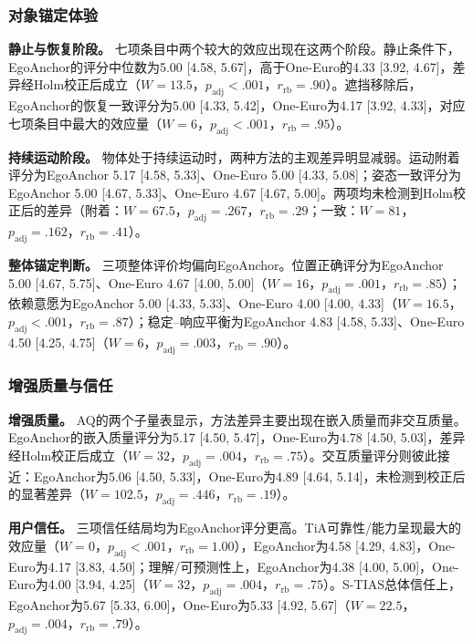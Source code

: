 \documentclass[review]{vgtc}
\begin{document}

\subsubsection{对象锚定体验}

\textbf{静止与恢复阶段。}
七项条目中两个较大的效应出现在这两个阶段。静止条件下，EgoAnchor的评分中位数为5.00 [4.58, 5.67]，高于One-Euro的4.33 [3.92, 4.67]，差异经Holm校正后成立（$W=13.5$，$p_{\mathrm{adj}}<.001$，$r_{\mathrm{rb}}=.90$）。遮挡移除后，EgoAnchor的恢复一致评分为5.00 [4.33, 5.42]，One-Euro为4.17 [3.92, 4.33]，对应七项条目中最大的效应量（$W=6$，$p_{\mathrm{adj}}<.001$，$r_{\mathrm{rb}}=.95$）。

\textbf{持续运动阶段。}
物体处于持续运动时，两种方法的主观差异明显减弱。运动附着评分为EgoAnchor 5.17 [4.58, 5.33]、One-Euro 5.00 [4.33, 5.08]；姿态一致评分为EgoAnchor 5.00 [4.67, 5.33]、One-Euro 4.67 [4.67, 5.00]。两项均未检测到Holm校正后的差异（附着：$W=67.5$，$p_{\mathrm{adj}}=.267$，$r_{\mathrm{rb}}=.29$；一致：$W=81$，$p_{\mathrm{adj}}=.162$，$r_{\mathrm{rb}}=.41$）。

\textbf{整体锚定判断。}
三项整体评价均偏向EgoAnchor。位置正确评分为EgoAnchor 5.00 [4.67, 5.75]、One-Euro 4.67 [4.00, 5.00]（$W=16$，$p_{\mathrm{adj}}=.001$，$r_{\mathrm{rb}}=.85$）；依赖意愿为EgoAnchor 5.00 [4.33, 5.33]、One-Euro 4.00 [4.00, 4.33]（$W=16.5$，$p_{\mathrm{adj}}<.001$，$r_{\mathrm{rb}}=.87$）；稳定--响应平衡为EgoAnchor 4.83 [4.58, 5.33]、One-Euro 4.50 [4.25, 4.75]（$W=6$，$p_{\mathrm{adj}}=.003$，$r_{\mathrm{rb}}=.90$）。

\subsubsection{增强质量与信任}

\textbf{增强质量。}
AQ的两个子量表显示，方法差异主要出现在嵌入质量而非交互质量。EgoAnchor的嵌入质量评分为5.17 [4.50, 5.47]，One-Euro为4.78 [4.50, 5.03]，差异经Holm校正后成立（$W=32$，$p_{\mathrm{adj}}=.004$，$r_{\mathrm{rb}}=.75$）。交互质量评分则彼此接近：EgoAnchor为5.06 [4.50, 5.33]，One-Euro为4.89 [4.64, 5.14]，未检测到校正后的显著差异（$W=102.5$，$p_{\mathrm{adj}}=.446$，$r_{\mathrm{rb}}=.19$）。

\textbf{用户信任。}
三项信任结局均为EgoAnchor评分更高。TiA可靠性/能力呈现最大的效应量（$W=0$，$p_{\mathrm{adj}}<.001$，$r_{\mathrm{rb}}=1.00$），EgoAnchor为4.58 [4.29, 4.83]，One-Euro为4.17 [3.83, 4.50]；理解/可预测性上，EgoAnchor为4.38 [4.00, 5.00]，One-Euro为4.00 [3.94, 4.25]（$W=32$，$p_{\mathrm{adj}}=.004$，$r_{\mathrm{rb}}=.75$）。S-TIAS总体信任上，EgoAnchor为5.67 [5.33, 6.00]，One-Euro为5.33 [4.92, 5.67]（$W=22.5$，$p_{\mathrm{adj}}=.004$，$r_{\mathrm{rb}}=.79$）。
\end{document}
